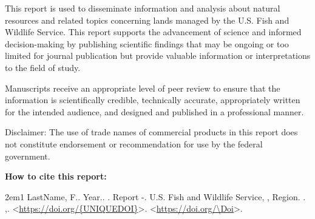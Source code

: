 \ifx\CoverImageCredit\empty\else
{\fontsize{8}{10}\selectfont\noindent\hfill \CoverImageCredit\par}%
\fi

\clearpage
\thispagestyle{empty}

This report is used to disseminate information and analysis about natural resources and related topics concerning lands managed by the U.S. Fish and Wildlife Service. This report supports the advancement of science and informed decision-making by publishing scientific findings that may be ongoing or too limited for journal publication but provide valuable information or interpretations to the field of study.

\vspace{12pt}
Manuscripts receive an appropriate level of peer review to ensure that the information is scientifically credible, technically accurate, appropriately written for the intended audience, and designed and published in a professional manner.

\vspace{12pt}
Disclaimer: The use of trade names of commercial products in this report does not constitute endorsement or recommendation for use by the federal government.

\vspace{12pt}
\noindent\textbf{How to cite this report:}\par

\begin{hangparas}{2em}{1}
\noindent
\ifx\CiteAuthorLine\empty LastName, F.\else \CiteAuthorLine\fi.\space
\ifx\ReportYear\empty Year.\else \ReportYear.\fi\space
\makeatletter{\begingroup\let\\\space\let\newline\space\@title\endgroup}\makeatother.\space
Report \ReportYear-\ReportNumber.\space
U.S. Fish and Wildlife Service,\space
\FwsProgram,\space
\FwsRegion\space Region.\space
\ifx\FwsStation\empty
  \ifx\Location\empty\else \Location.\space\fi
\else
  \FwsStation\ifx\Location\empty\else,\space \Location\fi.\space
\fi
\ifx\Doi\empty
\textless\url{https://doi.org/\{UNIQUEDOI\}}\textgreater.
\else
\textless\url{https://doi.org/\Doi}\textgreater.
\fi
\end{hangparas}

